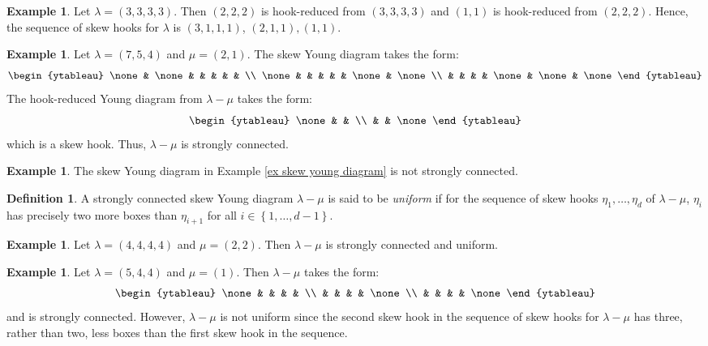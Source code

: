 \documentclass[11pt]{amsart}
\numberwithin{equation}{section}
\theoremstyle{definition}
\newtheorem{definition}[thm]{Definition}
\newtheorem{example}[thm]{Example}
\begin{document}
\begin{example}
Let $\lambda=(3,3,3,3)$. Then $(2,2,2)$ is hook-reduced from $(3,3,3,3)$ and $(1,1)$ is hook-reduced from $(2,2,2)$. Hence, the sequence of skew hooks for $\lambda$ is $(3,1,1,1)$, $(2,1,1), (1,1)$.
\end{example}

\begin{example}
Let $\lambda=(7,5,4)$ and $\mu=(2,1)$. The skew Young diagram takes the form:
\[
\begin{ytableau}
      \none & \none    &        &    &   &     & \\
  \none     &          &        &     &  & \none   & \none    \\
           &           &      &       & \none  & \none  & \none
\end{ytableau}
\]
The hook-reduced Young diagram from $\lambda - \mu$ takes the form:
\[  \begin{ytableau}
      \none  &  &     \\
             &  &  \none
\end{ytableau}
\]
which is a skew hook. Thus, $\lambda-\mu$ is strongly connected.
\end{example}

\begin{example}
The skew Young diagram in Example \ref{ex skew young diagram} is not strongly connected.
\end{example}



\begin{definition}
A strongly connected skew Young diagram $\lambda-\mu$ is said to be {\it uniform} if for the sequence of skew hooks $\eta_1,\ldots, \eta_d$ of $\lambda-\mu$,  $\eta_{i}$ has precisely two more boxes than $\eta_{i+1}$ for all $i \in \left\{1, \ldots, d-1\right\}$. 
\end{definition}

\begin{example}
Let $\lambda=(4,4,4,4)$ and $\mu=(2,2)$. Then $\lambda-\mu$ is strongly connected and uniform.
\end{example}

\begin{example}
Let $\lambda=(5,4,4)$ and $\mu=(1)$. Then $\lambda-\mu$ takes the form:
\[
\begin{ytableau}
      \none &       &        &    &     \\
            &          &        &     &  \none      \\
           &           &      &       & \none 
\end{ytableau}
\]
and is strongly connected. However, \(\lambda-\mu\) is not uniform since the second skew hook in the sequence of skew hooks for \(\lambda-\mu\) has three, rather than two, less boxes than the first skew hook in the sequence.
\end{example}
\end{document}

